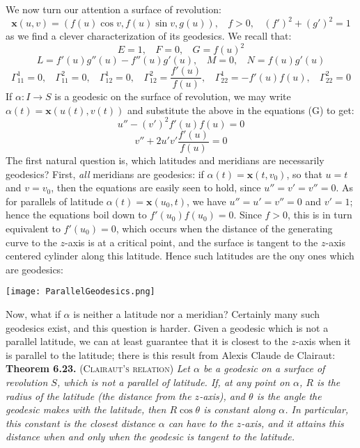 \documentclass[leqno]{book}
\begin{document}
\noindent We now turn our attention a surface of revolution:
$$\mathbf x(u,v)=(f(u)\cos v,f(u)\sin v,g(u)),~~~~f>0,~~~~(f')^2+(g')^2=1$$
as we find a clever characterization of its geodesics.  We recall that:
$$E=1,~~~~F=0,~~~~G=f(u)^2$$
$$L=f'(u)g''(u)-f''(u)g'(u),~~~~M=0,~~~~N=f(u)g'(u)$$
$$\Gamma_{11}^1=0,~~~~\Gamma_{11}^2=0,~~~~\Gamma_{12}^1=0,~~~~\Gamma_{12}^2=\frac{f'(u)}{f(u)},~~~~\Gamma_{22}^1=-f'(u)f(u),~~~~\Gamma_{22}^2=0$$
If $\alpha:I\to S$ is a geodesic on the surface of revolution, we may write $\alpha(t)=\mathbf x(u(t),v(t))$ and substitute the above in the equations (G) to get:
$$u''-(v')^2f'(u)f(u)=0$$
$$v''+2u'v'\frac{f'(u)}{f(u)}=0$$
The first natural question is, which latitudes and meridians are necessarily geodesics?  First, \emph{all} meridians are geodesics: if $\alpha(t)=\mathbf x(t,v_0)$, so that $u=t$ and $v=v_0$, then the equations are easily seen to hold, since $u''=v'=v''=0$.  As for parallels of latitude $\alpha(t)=\mathbf x(u_0,t)$, we have $u''=u'=v''=0$ and $v'=1$; hence the equations boil down to $f'(u_0)f(u_0)=0$.  Since $f>0$, this is in turn equivalent to $f'(u_0)=0$, which occurs when the distance of the generating curve to the $z$-axis is at a critical point, and the surface is tangent to the $z$-axis centered cylinder along this latitude.  Hence such latitudes are the ony ones which are geodesics:
\begin{center}
\texttt{[image: ParallelGeodesics.png]}
\end{center}
Now, what if $\alpha$ is neither a latitude nor a meridian?  Certainly many such geodesics exist, and this question is harder.  Given a geodesic which is not a parallel latitude, we can at least guarantee that it is closest to the $z$-axis when it is parallel to the latitude; there is this result from Alexis Claude de Clairaut:\\

\noindent\textbf{Theorem 6.23.} \textsc{(Clairaut's relation)} \emph{Let $\alpha$ be a geodesic on a surface of revolution $S$, which is not a parallel of latitude.  If, at any point on $\alpha$, $R$ is the radius of the latitude (the distance from the $z$-axis), and $\theta$ is the angle the geodesic makes with the latitude, then $R\cos\theta$ is constant along $\alpha$.  In particular, this constant is the closest distance $\alpha$ can have to the $z$-axis, and it attains this distance when and only when the geodesic is tangent to the latitude.}\\
\end{document}
